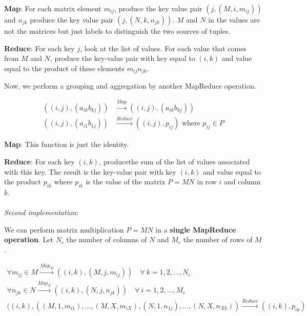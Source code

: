 \textbf{Map}: For each matrix element $m_{ij}$, produce the key value pair $(j, (M, i, m_{ij}))$ and $n_{jk}$ produce the key value pair $(j, (N, k, n_{jk}))$. $M$ and $N$ in the values are not the matrices but just labels to distinguish the two sources of tuples. 

\textbf{Reduce}: For each key $j$, look at the list of values. For each value that comes from $M$ and $N$, produce the key-value pair with key equal to $(i, k)$ and value equal to the product of these elements $m_{ij}n_{jk}$. 

Now, we perform a grouping and aggregation by another MapReduce operation.

\begin{equation*}
    \begin{split}
        ((i,j), (a_{ik} b_{kj})) & \xrightarrow{Map} ((i,j), (a_{ik} b_{kj}))\\
        ((i,j), (a_{i1} b_{1j})) & \xrightarrow{Reduce} ((i,j), p_{ij}) \text{ where } p_{ij} \in P  
    \end{split}
\end{equation*}

\textbf{Map}: This function is just the identity.  

\textbf{Reduce}: For each key $(i, k)$, producethe sum of the list of values associated with this key. The result is the key-value pair with key $(i, k)$ and value equal to the product $p_{ik}$ where $p_{ik}$ is the value of the matrix $P = MN$ in row $i$ and column $k$.
\\
\\
\textit{Second implementation}:

We can perform matrix multiplication $P = MN$ in a \textbf{single MapReduce operation}. Let $N_c$ the number of columns of $N$ and $M_r$ the number of rows of $M$. 

\begin{equation*}
    \begin{split}
        \forall m_{ij} \in M \xrightarrow{Map_M} ((i,k), (M,j,m_{ij})) \quad \forall \ k = 1, 2, \dots, N_c \\
        \forall n_{jk} \in N \xrightarrow{Map_N} ((i,k), (N,j,n_{jk})) \quad \forall \ i = 1, 2, \dots, M_r \\ 
        ((i,k), ((M, 1, m_{i1}),\dots, (M, X, m_{iX}), (N, 1, n_{1j}), \dots, (N, X, n_{Xk})) \xrightarrow{Reduce} ((i,k), p_{ik})
    \end{split}
\end{equation*}

